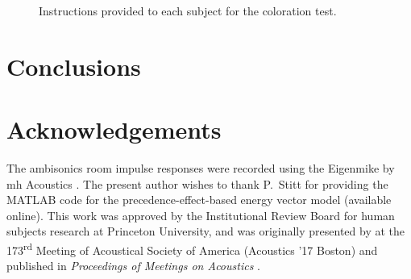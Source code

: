 \begin{figure}[t]
  \centering
  \setlength{\fboxsep}{0pt}
  \setlength{\fboxrule}{1pt}
  \caption{Instructions provided to each subject for the coloration test.}
  \label{fig:05_Proposed_Models:Coloration_Instructions}
\end{figure}

\section{Conclusions}\label{sec:05_Proposed_Models:Conclusions}


\section*{Acknowledgements}
The ambisonics room impulse responses were recorded using the Eigenmike by mh Acoustics \citep{EigenmikeURL}.
The present author wishes to thank P.~Stitt for providing the MATLAB code for the precedence-effect-based energy vector model (available online).
This work was approved by the Institutional Review Board for human subjects research at Princeton University,
and was originally presented by \citeauthor{TylkaChoueiri2017a} at the 173\textsuperscript{rd} Meeting of Acoustical Society of America (Acoustics '17 Boston) and published in \textit{Proceedings of Meetings on Acoustics} \citep{TylkaChoueiri2017a}.
